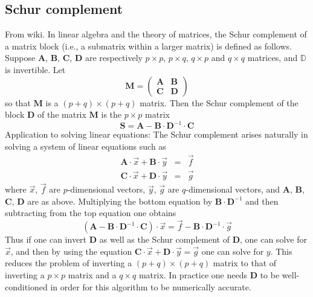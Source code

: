 \subsection{Schur complement}

From wiki.
In linear algebra and the theory of matrices, the Schur complement of a matrix block (i.e., a submatrix within a larger matrix) is defined as follows.
Suppose ${\bm A}$, ${\bm B}$, ${\bm C}$, ${\bm D}$
are respectively $p\times p$, $p \times q$, $q \times p$ and $q \times q$ matrices, and $\mathbb{D}$ is invertible. Let
\[
{\bm M}=
\left( \begin{array}{cc}
{\bm A} & {\bm B}  \\ 
{\bm C} & {\bm D}
\end{array} \right) 
\]
so that ${\bm M}$ is a $(p+q)\times(p+q)$ matrix.
Then the Schur complement of the block ${\bm D}$ of the matrix ${\bm M}$ is the $p \times p$ matrix
\[
{\bm S}={\bm A}-{\bm B}\cdot {\bm D}^{-1}\cdot {\bm C}
\]
Application to solving linear equations: The Schur complement arises naturally 
in solving a system of linear equations such as
\begin{eqnarray}
{\bm A}\cdot\vec x+{\bm B}\cdot \vec y &=& \vec f \nonumber\\
{\bm C}\cdot\vec x+{\bm D}\cdot \vec y &=& \vec g \nonumber
\end{eqnarray}
where $\vec x$, $\vec f$ are $p$-dimensional vectors, $\vec y$, $\vec g$
are $q$-dimensional vectors,
and ${\bm A}$, ${\bm B}$, ${\bm C}$, ${\bm D}$ are as above.
Multiplying the bottom equation by ${\bm B}\cdot {\bm D}^{-1}$ 
and then subtracting from the top equation one obtains
\[
({\bm A}-{\bm B}\cdot {\bm D}^{-1}\cdot {\bm C})\cdot \vec x = \vec f - {\bm B}\cdot {\bm D}^{-1}\cdot \vec g
\]
Thus if one can invert ${\bm D}$ as well as the Schur complement of ${\bm D}$, one can solve for $\vec x$,
and then by using the equation $\bm C\cdot \vec x + \bm D \cdot \vec y = \vec g$ one can solve for $y$.
This reduces the problem of inverting a $(p+q) \times (p+q)$ matrix to that of inverting
a $p \times p$ matrix and a $q \times q$ matrix.
In practice one needs ${\bm D}$ to be well-conditioned in order for 
this algorithm to be numerically accurate.

